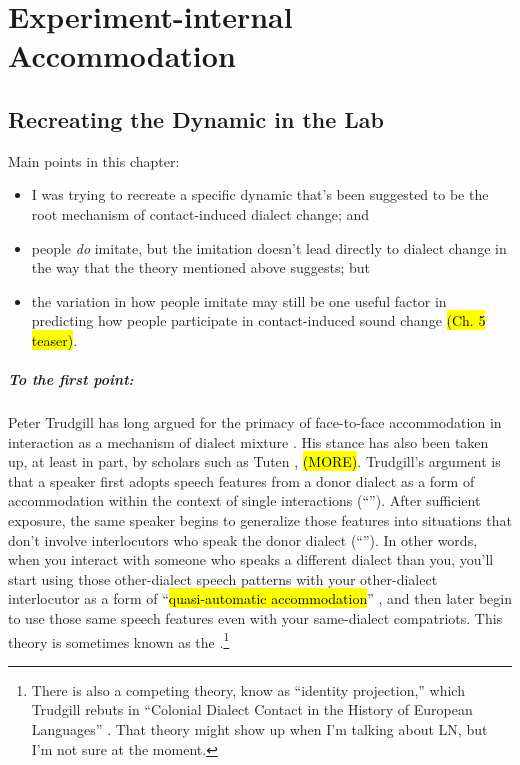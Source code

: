 \chapter{Experiment-internal Accommodation}
\label{internalchapter}
    
\section{Recreating the \cbat{} Dynamic in the Lab}
\label{sec:shadowingIntro}
    Main points in this chapter:
    \begin{itemize}
        \item I was trying to recreate a specific dynamic that's been suggested to be the root mechanism of contact-induced dialect change; and
        \item people \emph{do} imitate, but the imitation doesn't lead directly to dialect change in the way that the theory mentioned above suggests; but
        \item the variation in how people imitate may still be one useful factor in predicting how people participate in contact-induced sound change \IRL{} \hl{(Ch. 5 teaser)}.
    \end{itemize}

\paragraph{To the first point:}
    Peter Trudgill has long argued for the primacy of face-to-face accommodation in interaction as a mechanism of dialect mixture \citeyearpar{trudgill1986dialects, trudgill2008colonial}. His stance has also been taken up, at least in part, by scholars such as Tuten \citeyearpar{tuten2008identity}, \hl{(MORE)}. Trudgill's argument is that a speaker first adopts speech features from a donor dialect as a form of accommodation within the context of single interactions (``\sta{}''). After sufficient exposure, the same speaker begins to generalize those features into situations that don't involve interlocutors who speak the donor dialect (``\lta{}''). In other words, when you interact with someone who speaks a different dialect than you, you'll start using those other-dialect speech patterns with your other-dialect interlocutor as a form of ``\hl{quasi-automatic accommodation}'' \citep[p. ??]{trudgill2008colonial}, and then later begin to use those same speech features even with your same-dialect compatriots. %
    This theory is sometimes known as the \cbat{} \citep{auer2005role}.\footnote{There is also a competing theory, know as ``identity projection,'' which Trudgill rebuts in ``Colonial Dialect Contact in the History of European Languages'' \citeyearpar{trudgill2008colonial}. That theory might show up when I'm talking about LN, but I'm not sure at the moment.}
    
